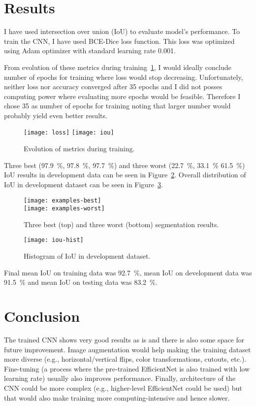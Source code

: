 \documentclass[9pt]{IEEEtran}
\begin{document}
\section{Results}
I have used intersection over union (IoU) to evaluate model's performance.
To train the CNN, I have used BCE-Dice loss function.
This loss was optimized using Adam optimizer with standard learning rate 0.001.

From evolution of these metrics during training~\ref{fig:evo}, I would ideally conclude number of epochs for training where loss would stop decreasing.
Unfortunately, neither loss nor accuracy converged after 35 epochs and I did not posses computing power where evaluating more epochs would be feasible.
Therefore I chose 35 as number of epochs for training noting that larger number would probably yield even better results.

\begin{figure}[h]
    \centering
    \texttt{[image: loss]}
    \texttt{[image: iou]}
    \caption{Evolution of metrics during training.}
    \label{fig:evo}
\end{figure}

Three best (97.9~\%, 97.8~\%, 97.7~\%) and three worst (22.7~\%, 33.1~\% 61.5~\%) IoU results in development data can be seen in Figure~\ref{fig:examples}.
Overall distribution of IoU in development dataset can be seen in Figure~\ref{fig:hist}.

\begin{figure}[H]
    \centering
    \texttt{[image: examples-best]}\\
    \vspace{0.5cm}
    \texttt{[image: examples-worst]}
    \caption{Three best (top) and three worst (bottom) segmentation results.}
    \label{fig:examples}
\end{figure}

\begin{figure}[H]
    \centering
    \texttt{[image: iou-hist]}
    \caption{Histogram of IoU in development dataset.}
    \label{fig:hist}
\end{figure}

Final mean IoU on training data was 92.7~\%, mean IoU on development data was 91.5~\% and mean IoU on testing data was 83.2~\%.

\section{Conclusion}
The trained CNN shows very good results as is and there is also some space for future improvement.
Image augmentation would help making the training dataset more diverse (e.g., horizontal/vertical flips, color transformations, cutouts, etc.).
Fine-tuning (a process where the pre-trained EfficientNet is also trained with low learning rate) usually also improves performance.
Finally, architecture of the CNN could be more complex (e.g., higher-level EfficientNet could be used) but that would also make training more computing-intensive and hence slower.



\end{document}
